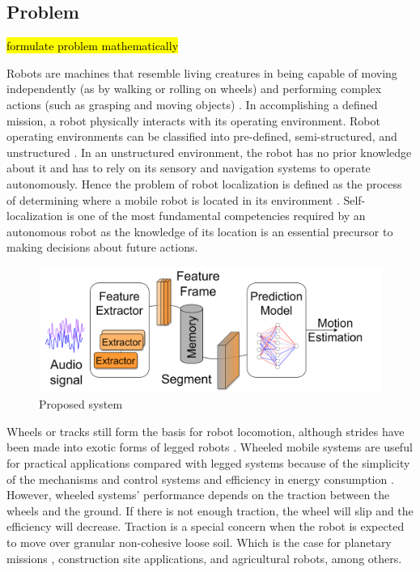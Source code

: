 \subsection{Problem} \label{subsec:problem}

\hl{formulate problem mathematically}

Robots are machines that resemble living creatures in being capable of moving
independently (as by walking or rolling on wheels) and performing complex
actions (such as grasping and moving objects) \cite{WebsterRobot}. In
accomplishing a defined mission, a robot physically interacts with its
operating environment. Robot operating environments can be classified into
pre-defined, semi-structured, and unstructured \cite{Chen09}. In an
unstructured environment, the robot has no prior knowledge about it and has to
rely on its sensory and navigation systems to operate autonomously. Hence the
problem of robot localization is defined as the process of determining where a
mobile robot is located in its environment \cite{Localization2016}.
Self-localization is one of the most fundamental competencies required by an
autonomous robot as the knowledge of its location is an essential precursor to
making decisions about future actions.

\begin{figure}[t]
    \centering
    \includegraphics[width=\linewidth]{content/system.drawio.png}
    \caption{Proposed system}
    \label{fig:system}
\end{figure}

Wheels or tracks still form the basis for robot locomotion, although strides
have been made into exotic forms of legged robots \cite{Sanchez09}. Wheeled
mobile systems are useful for practical applications compared with legged
systems because of the simplicity of the mechanisms and control systems and
efficiency in energy consumption \cite{Masayoshi2006}. However, wheeled
systems' performance depends on the traction between the wheels and the ground.
If there is not enough traction, the wheel will slip and the efficiency will
decrease. Traction is a special concern when the robot is expected to move over
granular non-cohesive loose soil. Which is the case for planetary missions
\cite{Amar2007}, construction site applications, and agricultural robots, among
others.

